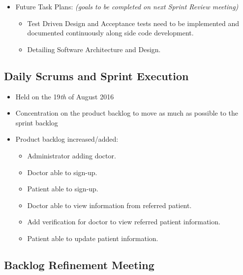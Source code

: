 \documentclass[a4paper]{article}
\begin{document}
\begin{itemize}
\begin{itemize}
\end{itemize}

\item Future Task Plans: \emph{(goals to be completed on next Sprint Review meeting)}

\begin{itemize}

\item Test Driven Design and Acceptance tests need to be implemented and documented continuously along side code development.

\item Detailing Software Architecture and Design.

\end{itemize}

\end{itemize}

\subsection{Daily Scrums and Sprint Execution}

\begin{itemize}
\item Held on the 19\textit{th} of August 2016
\item Concentration on the product backlog to move as much as possible to the sprint backlog
\item Product backlog increased/added:

\begin{itemize}
\item Administrator adding doctor.
\item Doctor able to sign-up.
\item Patient able to sign-up.
\item Doctor able to view information from referred patient.
\item Add verification for doctor to view referred patient information.
\item Patient able to update patient information.
\end{itemize}

\end{itemize}

\subsection{Backlog Refinement Meeting}
\end{document}
